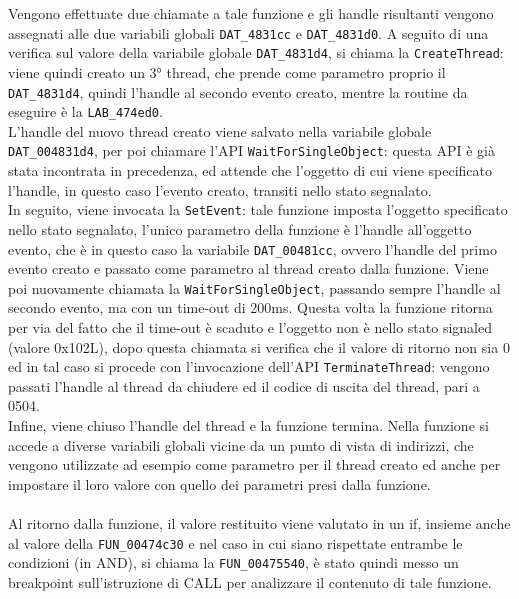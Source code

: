 \documentclass[12pt]{extarticle}
\begin{document}
Vengono effettuate due chiamate a tale funzione e gli handle risultanti vengono assegnati alle due variabili globali \texttt{DAT\_4831cc} e \texttt{DAT\_4831d0}. A seguito di una verifica sul valore della variabile globale \texttt{DAT\_4831d4}, si chiama la \texttt{CreateThread}: viene quindi creato un 3° thread, che prende come parametro proprio il \texttt{DAT\_4831d4}, quindi l'handle al secondo evento creato, mentre la routine da eseguire è la \texttt{LAB\_474ed0}.\\L'handle del nuovo thread creato viene salvato nella variabile globale \texttt{DAT\_004831d4}, per poi chiamare l'API \texttt{WaitForSingleObject}: questa API è già stata incontrata in precedenza, ed attende che l'oggetto di cui viene specificato l'handle, in questo caso l'evento creato, transiti nello stato segnalato.\\In seguito, viene invocata la \texttt{SetEvent}: tale funzione imposta l'oggetto specificato nello stato segnalato, l'unico parametro della funzione è l'handle all'oggetto evento, che è in questo caso la variabile \texttt{DAT\_00481cc}, ovvero l'handle del primo evento creato e passato come parametro al thread creato dalla funzione. Viene poi nuovamente chiamata la \texttt{WaitForSingleObject}, passando sempre l'handle al secondo evento, ma con un time-out di 200ms. Questa volta la funzione ritorna per via del fatto che il time-out è scaduto e l'oggetto non è nello stato signaled (valore 0x102L), dopo questa chiamata si verifica che il valore di ritorno non sia 0 ed in tal caso si procede con l'invocazione dell'API \texttt{TerminateThread}: vengono passati l'handle al thread da chiudere ed il codice di uscita del thread, pari a 0504.\\Infine, viene chiuso l'handle del thread e la funzione termina. Nella funzione si accede a diverse variabili globali vicine da un punto di vista di indirizzi, che vengono utilizzate ad esempio come parametro per il thread creato ed anche per impostare il loro valore con quello dei parametri presi dalla funzione.\\\\Al ritorno dalla funzione, il valore restituito viene valutato in un if, insieme anche al valore della \texttt{FUN\_00474c30} e nel caso in cui siano rispettate entrambe le condizioni (in AND), si chiama la \texttt{FUN\_00475540}, è stato quindi messo un breakpoint sull'istruzione di CALL per analizzare il contenuto di tale funzione.  
\end{document}
